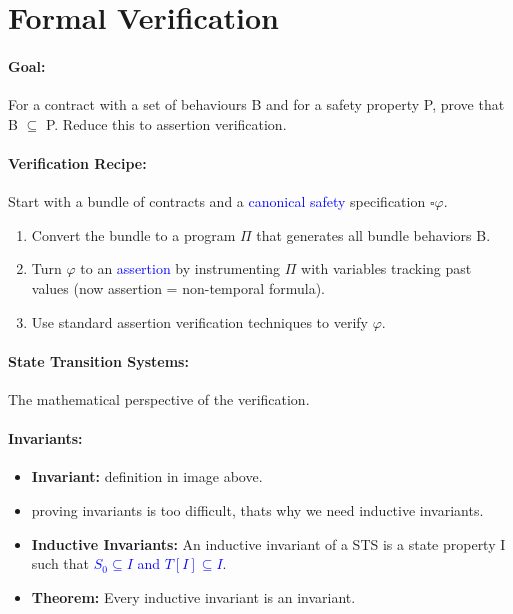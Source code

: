 \section{Formal Verification}

\paragraph{Goal: } For a contract with a set of behaviours B and for a safety property P, prove that B $\subseteq$ P. Reduce this to assertion verification.

\paragraph{Verification Recipe: } Start with a bundle of contracts and a \textcolor{blue}{canonical safety} specification $\square\varphi$.
\begin{enumerate}
    \item Convert the bundle to a program $\Pi$ that generates all bundle behaviors B.
    \item Turn $\varphi$ to an \textcolor{blue}{assertion} by instrumenting $\Pi$ with variables tracking past values (now assertion = non-temporal formula).
    \item Use standard assertion verification techniques to verify $\varphi$.
\end{enumerate}

\paragraph{State Transition Systems: } The mathematical perspective of the verification.

\begin{minipage}{0.9\linewidth}
    \centering      
    \def\svgwidth{\linewidth}
        
\end{minipage}

\paragraph{Invariants: } 
\begin{itemize}
    \item {\textbf{Invariant:}} definition in image above. 
    \item proving invariants is too difficult, thats why we need inductive invariants.
    \item \textbf{Inductive Invariants:} An inductive invariant of a STS is a state property I such that \textcolor{blue}{$S_0 \subseteq I$ and $T[I] \subseteq I$}.
    \item \textbf{Theorem: } Every inductive invariant is an invariant.
\end{itemize}

